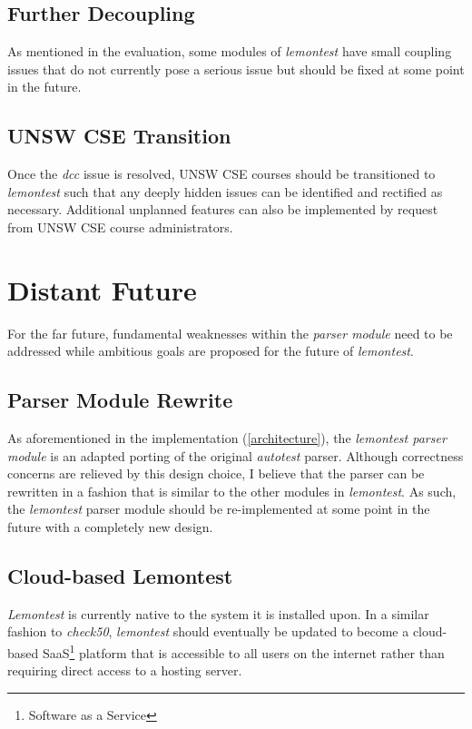 \documentclass[hidelinks]{report}
\begin{document}
\subsection{Further Decoupling}
As mentioned in the evaluation, some modules of \textit{lemontest} have small coupling issues that do not currently pose a serious issue but should be fixed at some point in the future.

\subsection{UNSW CSE Transition}
Once the \textit{dcc} issue is resolved, UNSW CSE courses should be transitioned to \textit{lemontest} such that any deeply hidden issues can be identified and rectified as necessary. Additional unplanned features can also be implemented by request from UNSW CSE course administrators.

\section{Distant Future}
For the far future, fundamental weaknesses within the \textit{parser module} need to be addressed while ambitious goals are proposed for the future of \textit{lemontest}.

\subsection{Parser Module Rewrite}
As aforementioned in the implementation (\autoref{architecture}), the \textit{lemontest parser module} is an adapted porting of the original \textit{autotest} parser. Although correctness concerns are relieved by this design choice, I believe that the parser can be rewritten in a fashion that is similar to the other modules in \textit{lemontest}. As such, the \textit{lemontest} parser module should be re-implemented at some point in the future with a completely new design.

\subsection{Cloud-based Lemontest}
\textit{Lemontest} is currently native to the system it is installed upon. In a similar fashion to \textit{check50}, \textit{lemontest} should eventually be updated to become a cloud-based SaaS\footnote{Software as a Service} platform that is accessible to all users on the internet rather than requiring direct access to a hosting server.
\end{document}

